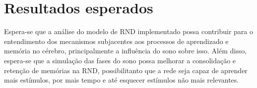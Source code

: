 \section{Resultados esperados}

Espera-se que a análise do modelo de RND implementado possa contribuir para o entendimento dos mecanismos subjacentes aos
processos de aprendizado e memória no cérebro, principalmente a influência do sono sobre isso. Além disso, espera-se que a
simulação das fases do sono possa melhorar a consolidação e retenção de memórias na RND, possibilitanto que a rede seja capaz de
aprender mais estímulos, por mais tempo e até esquecer estímulos não mais relevantes.
